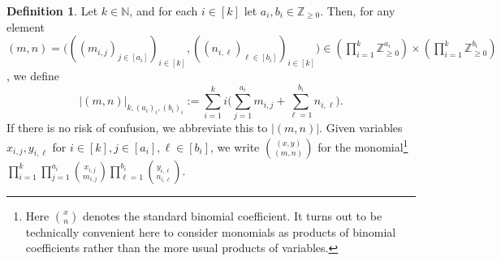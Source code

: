 \documentclass[a4paper,12pt,reqno]{amsart}
\theoremstyle{definition}
\newtheorem{defn}[theorem]{Definition}
\newcommand{\mb}{\mathbb}
\begin{document}
\begin{defn}\label{def:height-lattice}
Let $k\in \mb{N}$, and for each $i\in [k]$ let $a_i,b_i\in\mb{Z}_{\ge 0}$. Then, for any element $(m,n)= \big(((m_{i,j})_{j\in [a_i]})_{i\in[k]},((n_{i,\ell})_{\ell\in [b_i]})_{i\in[k]}\big) \in (\prod_{i=1}^k \mb{Z}_{\ge 0}^{a_i})\times (\prod_{i=1}^k \mb{Z}_{\ge 0}^{b_i})$, we define \[
|(m,n)|_{k,(a_i)_i,(b_i)_i}:=\sum_{i=1}^k i\Big(\sum_{j=1}^{a_i} m_{i,j}+\sum_{\ell=1}^{b_i} n_{i,\ell}\Big).
\]
If there is no risk of confusion, we abbreviate this to $|(m,n)|$. Given variables $x_{i,j},y_{i,\ell}$ for $i\in[k], j\in [a_i],\ell\in[b_i]$, we write $\binom{(x,y)}{(m,n)}$ for the monomial\footnote{Here $\binom{x}{n}$ denotes the standard binomial coefficient. It turns out to be technically convenient here to consider monomials as products of binomial coefficients rather than the more usual products of variables.} $\prod_{i=1}^k\prod_{j=1}^{a_i} \binom{x_{i,j}}{m_{i,j}}\prod_{\ell=1}^{b_i} \binom{y_{i,\ell}}{n_{i,\ell}}$.
\end{defn}
\end{document}
